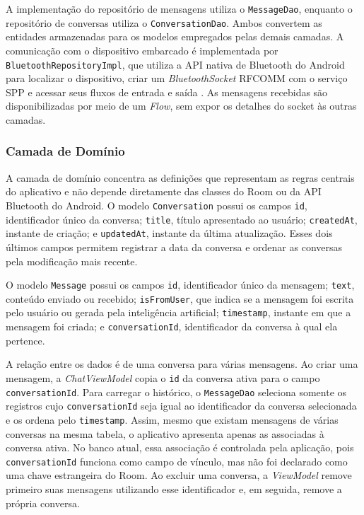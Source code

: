 \documentclass[12pt]{article}
\begin{document}
A implementação do repositório de mensagens utiliza o \texttt{MessageDao}, enquanto o repositório de conversas utiliza o \texttt{ConversationDao}. Ambos convertem as entidades armazenadas para os modelos empregados pelas demais camadas. A comunicação com o dispositivo embarcado é implementada por \texttt{BluetoothRepositoryImpl}, que utiliza a API nativa de Bluetooth do Android para localizar o dispositivo, criar um \textit{BluetoothSocket} RFCOMM com o serviço SPP e acessar seus fluxos de entrada e saída \cite{androidbluetooth2026}. As mensagens recebidas são disponibilizadas por meio de um \textit{Flow}, sem expor os detalhes do socket às outras camadas.

\subsubsection{Camada de Domínio}

A camada de domínio concentra as definições que representam as regras centrais do aplicativo e não depende diretamente das classes do Room ou da API Bluetooth do Android. O modelo \texttt{Conversation} possui os campos \texttt{id}, identificador único da conversa; \texttt{title}, título apresentado ao usuário; \texttt{createdAt}, instante de criação; e \texttt{updatedAt}, instante da última atualização. Esses dois últimos campos permitem registrar a data da conversa e ordenar as conversas pela modificação mais recente.

O modelo \texttt{Message} possui os campos \texttt{id}, identificador único da mensagem; \texttt{text}, conteúdo enviado ou recebido; \texttt{isFromUser}, que indica se a mensagem foi escrita pelo usuário ou gerada pela inteligência artificial; \texttt{timestamp}, instante em que a mensagem foi criada; e \texttt{conversationId}, identificador da conversa à qual ela pertence.

A relação entre os dados é de uma conversa para várias mensagens. Ao criar uma mensagem, a \textit{ChatViewModel} copia o \texttt{id} da conversa ativa para o campo \texttt{conversationId}. Para carregar o histórico, o \texttt{MessageDao} seleciona somente os registros cujo \texttt{conversationId} seja igual ao identificador da conversa selecionada e os ordena pelo \texttt{timestamp}. Assim, mesmo que existam mensagens de várias conversas na mesma tabela, o aplicativo apresenta apenas as associadas à conversa ativa. No banco atual, essa associação é controlada pela aplicação, pois \texttt{conversationId} funciona como campo de vínculo, mas não foi declarado como uma chave estrangeira do Room. Ao excluir uma conversa, a \textit{ViewModel} remove primeiro suas mensagens utilizando esse identificador e, em seguida, remove a própria conversa.
\end{document}
